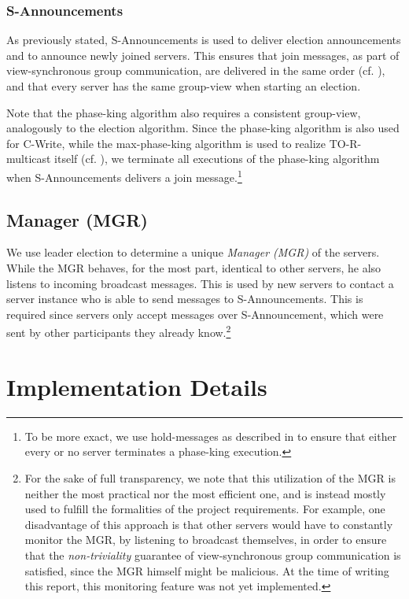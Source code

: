 \documentclass[runningheads]{llncs}
\begin{document}
\subsubsection{S-Announcements}
As previously stated, \textsf{S-Announcements} is used to deliver election announcements and to announce newly joined servers. This ensures that join messages, as part of view-synchronous group communication, are delivered in the same order (cf. ), and that every server has the same group-view when starting an election. 

Note that the phase-king algorithm also requires a consistent group-view, analogously to the election algorithm. Since the phase-king algorithm is also used for \textsf{C-Write}, while the max-phase-king algorithm is used to realize TO-R-multicast itself (cf. ), we terminate all executions of the phase-king algorithm when \textsf{S-Announcements} delivers a join message.\footnote{To be more exact, we use hold-messages as described in  to ensure that either every or no server terminates a phase-king execution.}

\subsection{Manager (MGR)}
We use leader election to determine a unique \textit{Manager (MGR)} of the servers. While the MGR behaves, for the most part, identical to other servers, he also listens to incoming broadcast messages. This is used by new servers to contact a server instance who is able to send messages to \textsf{S-Announcements}. This is required since servers only accept messages over \textsf{S-Announcement}, which were sent by other participants they already know.\footnote{For the sake of full transparency, we note that this utilization of the MGR is neither the most practical nor the most efficient one, and is instead mostly used to fulfill the formalities of the project requirements. For example, one disadvantage of this approach is that other servers would have to constantly monitor the MGR, by listening to broadcast themselves, in order to ensure that the \textit{non-triviality} guarantee of view-synchronous group communication is satisfied, since the MGR himself might be malicious. At the time of writing this report, this monitoring feature was not yet implemented.\label{footnote:mgr}}

\newpage
\section{Implementation Details}\label{sec:implementation}
\end{document}
